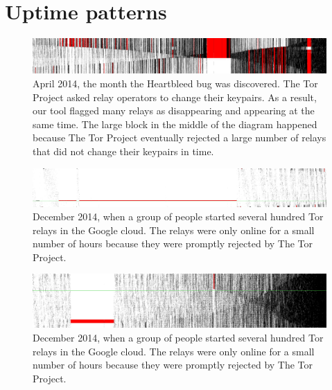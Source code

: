\appendix

\section{Uptime patterns}

\begin{figure}[t]
	\centering
	\includegraphics[width=\textwidth]{diagrams/heartbleed-uptimes.jpg}
	\caption{April 2014, the month the Heartbleed bug was discovered.  The Tor
		Project asked relay operators to change their keypairs.  As a result,
		our tool flagged many relays as disappearing and appearing at the same
		time.  The large block in the middle of the diagram happened because The
		Tor Project eventually rejected a large number of relays that did not
		change their keypairs in time.}
	\label{fig:heartbleed-uptimes}
\end{figure}

\begin{figure}[t]
	\centering
	\includegraphics[width=\textwidth]{diagrams/lizard-uptimes.jpg}
	\caption{December 2014, when a group of people started several hundred Tor
	relays in the Google cloud.  The relays were only online for a small number
	of hours because they were promptly rejected by The Tor Project.}
	\label{fig:lizard-uptimes}
\end{figure}

\begin{figure}[t]
	\centering
	\includegraphics[width=\textwidth]{diagrams/planetlab-uptimes.jpg}
	\caption{December 2014, when a group of people started several hundred Tor
	relays in the Google cloud.  The relays were only online for a small number
	of hours because they were promptly rejected by The Tor Project.}
	\label{fig:lizard-uptimes}
\end{figure}

